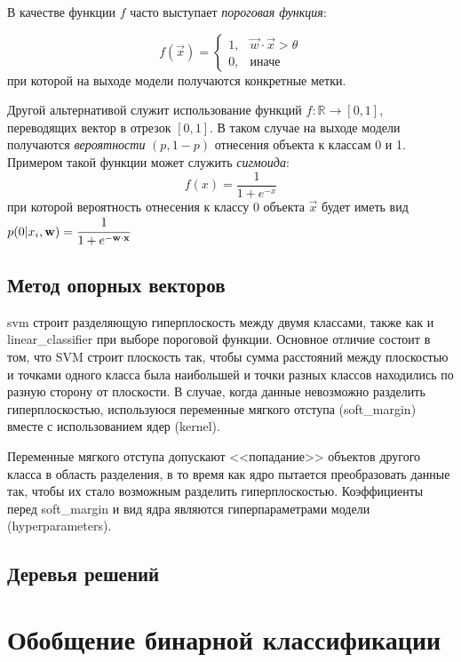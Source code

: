 В качестве функции $f$ часто выступает \textit{пороговая функция}:

\begin{equation}
    \label{eq:threshold_func}
    f(\vec{x}) =
    \begin{cases}
        1, & \vec{w} \cdot \vec{x} > \theta \\
        0, & \text{иначе}
    \end{cases}
\end{equation}
при которой на выходе модели получаются конкретные метки.

Другой альтернативой служит использование функций $f: \mathbb{R} \rightarrow [0, 1]$, переводящих вектор в отрезок $[0, 1]$.
В таком случае на выходе модели получаются \textit{вероятности} $(p, 1 - p)$ отнесения объекта к классам 0 и 1.
Примером такой функции может служить \textit{сигмоида}:
\begin{equation}
    \label{eq:sigmoid}
    f (x) = \frac{1}{1 + e^{-x}}
\end{equation}
при которой вероятность отнесения к классу 0 объекта $\vec{x}$ будет иметь вид $p(0 | x_i, \vec{w}) = \cfrac{1}{1 + e^{-\vec{w} \cdot \vec{x}}}$
\subsection{Метод опорных векторов}
\Gls{svm} строит разделяющую гиперплоскость между двумя классами, также как и \gls{linear_classifier} при выборе пороговой функции.
Основное отличие состоит в том, что SVM строит плоскость так, чтобы сумма расстояний между плоскостью и точками одного класса была наибольшей и точки разных классов находились по разную сторону от плоскости.
В случае, когда данные невозможно разделить гиперплоскостью, используюся переменные мягкого отступа (\gls{soft_margin}) вместе с использованием ядер (\gls{kernel}).

Переменные мягкого отступа допускают <<попадание>> объектов другого класса в область разделения, в то время как ядро пытается преобразовать данные так, чтобы их стало возможным разделить гиперплоскостью. Коэффициенты перед \gls{soft_margin} и вид ядра являются гиперпараметрами модели (\gls{hyperparameters}).
\subsection{Деревья решений}

\section{Обобщение бинарной классификации}
